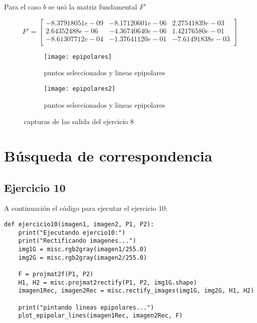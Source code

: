 \documentclass[paper=a4, fontsize=11pt]{scrartcl} %
\numberwithin{equation}{section} %
\numberwithin{figure}{section} %
\numberwithin{table}{section} %
\begin{document}
Para el caso $b$ se usó la matriz fundamental $F'$

\begin{equation}
	F'=
	\begin{bmatrix}
		-8.37918051e-09 & -8.17120601e-06 & 2.27541839e-03 \\
		2.64352488e-06  & -4.36740640e-06 & 1.42176580e-01 \\
		-8.61307712e-04 & -1.37641120e-01 & -7.61491838e-03 \\
	\end{bmatrix}
\end{equation}

\begin{figure}
\begin{subfigure}{.5\textwidth}
  \centering
  \texttt{[image: epipolares]}
  \caption{puntos seleccionados y lineas epipolares}
  \label{fig:sfig1}
\end{subfigure}%
\begin{subfigure}{.5\textwidth}
  \centering
  \texttt{[image: epipolares2]}
  \caption{puntos seleccionados y lineas epipolares}
  \label{fig:sfig2}
\end{subfigure}
\caption{capturas de las salida del ejercicio 8}
\label{fig:fig}
\end{figure}

\newpage

\section{Búsqueda de correspondencia}
\subsection{Ejercicio 10}

A continuación el código para ejecutar el ejercicio 10:

\begin{lstlisting}
def ejercicio10(imagen1, imagen2, P1, P2):
    print("Ejecutando ejercio10:")
    print("Rectificando imagenes...")
    img1G = misc.rgb2gray(imagen1/255.0)
    img2G = misc.rgb2gray(imagen2/255.0)

    F = projmat2f(P1, P2)
    H1, H2 = misc.projmat2rectify(P1, P2, img1G.shape)
    imagen1Rec, imagen2Rec = misc.rectify_images(img1G, img2G, H1, H2)

    print("pintando lineas epipolares...")
    plot_epipolar_lines(imagen1Rec, imagen2Rec, F)
\end{lstlisting}
\end{document}
